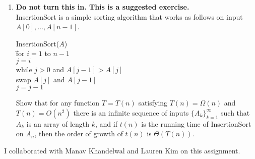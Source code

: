 \documentclass[11pt]{article}
\begin{document}
\begin{enumerate}
\item {\bf Do not turn this in.  This is a suggested exercise.}  \\
InsertionSort is a simple sorting algorithm that works as follows on input $A[0], \ldots, A[n-1]$.


\begin{tabbing}

InsertionSort($A$) \\
\quad\quad \= for $i=1$ to $n-1$\\       
           \> \quad $j=i$ \\ 
           \> \quad while $j > 0$ and $A[j-1] > A[j]$ \\ 
           \> \quad \quad swap $A[j]$ and $A[j-1]$ \\ 
           \> \quad \quad $j = j-1$\\
\end{tabbing}

Show that for any function $T = T(n)$ satisfying $T(n) = \Omega(n)$ and $T(n) = O(n^2)$ there is an
infinite sequence of inputs $\{A_k\}_{k=1}^\infty$ such that $A_k$ is an array of length $k$, and
if $t(n)$ is the running time of InsertionSort on $A_n$, then the order of growth of $t(n)$ is
$\Theta(T(n))$.  
\end{enumerate}

\pagebreak
I collaborated with Manav Khandelwal and Lauren Kim on this assignment.  
\end{document}
